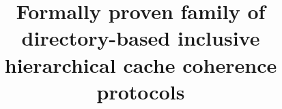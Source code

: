 \title{
Formally proven family of directory-based inclusive hierarchical cache coherence protocols
}

